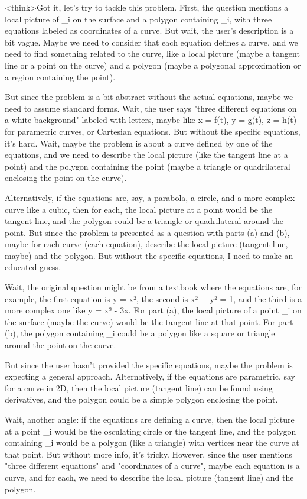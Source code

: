 <think>Got it, let's try to tackle this problem. First, the question mentions a local picture of _i on the surface and a polygon containing _i, with three equations labeled as coordinates of a curve. But wait, the user's description is a bit vague. Maybe we need to consider that each equation defines a curve, and we need to find something related to the curve, like a local picture (maybe a tangent line or a point on the curve) and a polygon (maybe a polygonal approximation or a region containing the point).

But since the problem is a bit abstract without the actual equations, maybe we need to assume standard forms. Wait, the user says "three different equations on a white background" labeled with letters, maybe like x = f(t), y = g(t), z = h(t) for parametric curves, or Cartesian equations. But without the specific equations, it's hard. Wait, maybe the problem is about a curve defined by one of the equations, and we need to describe the local picture (like the tangent line at a point) and the polygon containing the point (maybe a triangle or quadrilateral enclosing the point on the curve).

Alternatively, if the equations are, say, a parabola, a circle, and a more complex curve like a cubic, then for each, the local picture at a point would be the tangent line, and the polygon could be a triangle or quadrilateral around the point. But since the problem is presented as a question with parts (a) and (b), maybe for each curve (each equation), describe the local picture (tangent line, maybe) and the polygon. But without the specific equations, I need to make an educated guess.

Wait, the original question might be from a textbook where the equations are, for example, the first equation is y = x², the second is x² + y² = 1, and the third is a more complex one like y = x³ - 3x. For part (a), the local picture of a point _i on the surface (maybe the curve) would be the tangent line at that point. For part (b), the polygon containing _i could be a polygon like a square or triangle around the point on the curve.

But since the user hasn't provided the specific equations, maybe the problem is expecting a general approach. Alternatively, if the equations are parametric, say for a curve in 2D, then the local picture (tangent line) can be found using derivatives, and the polygon could be a simple polygon enclosing the point.

Wait, another angle: if the equations are defining a curve, then the local picture at a point _i would be the osculating circle or the tangent line, and the polygon containing _i would be a polygon (like a triangle) with vertices near the curve at that point. But without more info, it's tricky. However, since the user mentions "three different equations" and "coordinates of a curve", maybe each equation is a curve, and for each, we need to describe the local picture (tangent line) and the polygon.

